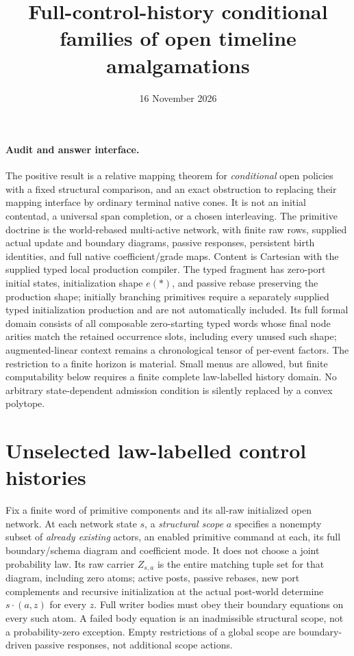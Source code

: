 \documentclass[11pt]{article}
\title{Full-control-history conditional families of open timeline amalgamations}
\date{16 November 2026}
\begin{document}
\maketitle
\paragraph{Audit and answer interface.}
The positive result is a relative mapping theorem for \emph{conditional} open policies with a fixed structural comparison, and an exact obstruction to replacing their mapping interface by ordinary terminal native cones. It is not an initial contentad, a universal span completion, or a chosen interleaving. The primitive doctrine is the world-rebased multi-active network, with finite raw rows, supplied actual update and boundary diagrams, passive responses, persistent birth identities, and full native coefficient/grade maps. Content is Cartesian with the supplied typed local production compiler. The typed fragment has zero-port initial states, initialization shape $e(*)$, and passive rebase preserving the production shape; initially branching primitives require a separately supplied typed initialization production and are not automatically included. Its full formal domain consists of all composable zero-starting typed words whose final node arities match the retained occurrence slots, including every unused such shape; augmented-linear context remains a chronological tensor of per-event factors. The restriction to a finite horizon is material. Small menus are allowed, but finite computability below requires a finite complete law-labelled history domain. No arbitrary state-dependent admission condition is silently replaced by a convex polytope.

\section{Unselected law-labelled control histories}
Fix a finite word of primitive components and its all-raw initialized open network. At each network state $s$, a \emph{structural scope} $a$ specifies a nonempty subset of \emph{already existing} actors, an enabled primitive command at each, its full boundary/schema diagram and coefficient mode. It does not choose a joint probability law. Its raw carrier $Z_{s,a}$ is the entire matching tuple set for that diagram, including zero atoms; active posts, passive rebases, new port complements and recursive initialization at the actual post-world determine $s\cdot(a,z)$ for every $z$. Full writer bodies must obey their boundary equations on every such atom. A failed body equation is an inadmissible structural scope, not a probability-zero exception. Empty restrictions of a global scope are boundary-driven passive responses, not additional scope actions.
\end{document}

